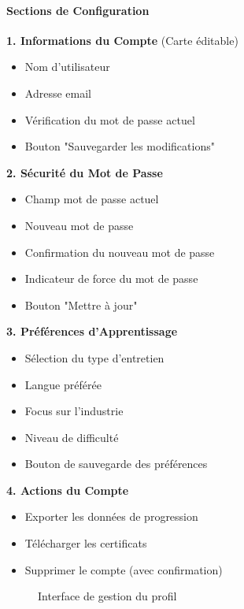 \documentclass[12pt, a4paper]{report}
\begin{document}
\paragraph{Sections de Configuration}

\textbf{1. Informations du Compte} (Carte éditable)
\begin{itemize}
    \item Nom d'utilisateur
    \item Adresse email
    \item Vérification du mot de passe actuel
    \item Bouton "Sauvegarder les modifications"
\end{itemize}

\textbf{2. Sécurité du Mot de Passe}
\begin{itemize}
    \item Champ mot de passe actuel
    \item Nouveau mot de passe
    \item Confirmation du nouveau mot de passe
    \item Indicateur de force du mot de passe
    \item Bouton "Mettre à jour"
\end{itemize}

\textbf{3. Préférences d'Apprentissage}
\begin{itemize}
    \item Sélection du type d'entretien
    \item Langue préférée
    \item Focus sur l'industrie
    \item Niveau de difficulté
    \item Bouton de sauvegarde des préférences
\end{itemize}

\textbf{4. Actions du Compte}
\begin{itemize}
    \item Exporter les données de progression
    \item Télécharger les certificats
    \item Supprimer le compte (avec confirmation)
\end{itemize}

\begin{figure}[H]
    \centering
    \caption{Interface de gestion du profil}
    \label{fig:profile}
\end{figure}
\end{document}
